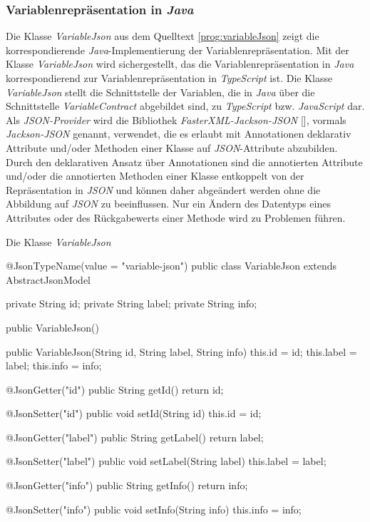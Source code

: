 \subsubsection{Variablenrepräsentation in \emph{Java}}
Die Klasse \emph{VariableJson} aus dem Quelltext \ref{prog:variableJson} zeigt die korrespondierende \emph{Java}-Implementierung der Variablenrepräsentation. Mit der Klasse \emph{VariableJson} wird sichergestellt, das die Variablenrepräsentation in \emph{Java} korrespondierend zur Variablenrepräsentation in \emph{TypeScript} ist.
\newline
\newline
Die Klasse \emph{VariableJson} stellt die Schnittstelle der Variablen, die in \emph{Java} über die Schnittstelle \emph{VariableContract} abgebildet sind, zu \emph{TypeScript} bzw. \emph{JavaScript} dar. Als \emph{JSON-Provider} wird die Bibliothek \emph{FasterXML-Jackson-JSON} [\cite{fasterXml}], vormals \emph{Jackson-JSON} genannt, verwendet, die es erlaubt mit Annotationen deklarativ Attribute und/oder Methoden einer Klasse auf \emph{JSON}-Attribute abzubilden. Durch den deklarativen Ansatz über Annotationen sind die annotierten  Attribute und/oder die annotierten Methoden einer Klasse entkoppelt von der Repräsentation in \emph{JSON} und können daher abgeändert werden ohne die Abbildung auf \emph{JSON} zu beeinflussen. Nur ein Ändern des Datentyps eines Attributes oder des Rückgabewerts einer Methode wird zu Problemen führen. 
\newline
\begin{program}
\caption{Die Klasse \emph{VariableJson}}
\label{prog:variableJson}
\begin{JsCode}
@JsonTypeName(value = "variable-json")
public class VariableJson extends AbstractJsonModel {

    private String id;
    private String label;
    private String info;

    public VariableJson() {
    }
    
    public VariableJson(String id, String label, String info) {
        this.id    = id;
        this.label = label;
        this.info  = info;
    }

    @JsonGetter("id")
    public String getId() { 
       return id; 
    }

    @JsonSetter("id")
    public void setId(String id) { 
       this.id = id; 
    }

    @JsonGetter("label")
    public String getLabel() { 
       return label; 
    }

    @JsonSetter("label")
    public void setLabel(String label) { 
       this.label = label; 
    }

    @JsonGetter("info")
    public String getInfo() { 
       return info; 
    }

    @JsonSetter("info")
    public void setInfo(String info) { 
       this.info = info; 
    }
    
}
\end{JsCode}
\end{program}
\ \newline

